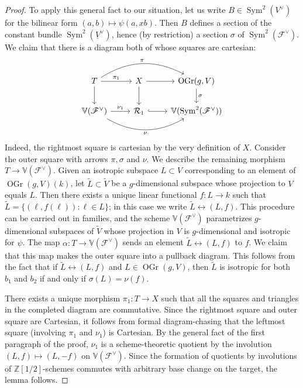 \documentclass{article} %
\numberwithin{equation}{section}
\DeclareMathOperator{\Sym}{Sym}
\newcommand{\sh}[1]{\mathscr{#1}}
\newcommand{\Z}{\mathbb{Z}}
\DeclareMathOperator{\OGr}{OGr}
\begin{document}
\begin{proof}
    To apply this general fact to our situation, 
   let us write $B \in \Sym^2(V^{\vee})$ for the bilinear form $(a,b)\mapsto \psi(a,xb)$. 
    Then $B$ defines a section of the constant bundle $\Sym^2(\underline{V}^{\vee})$, hence (by restriction)  a section $\sigma$ of $\Sym^2(\sh{F}^{\vee})$.
    We claim that there is a diagram both of whose squares are cartesian:
\begin{equation}
\label{diagram_threesquares}
\begin{tikzcd}
	T & X & {\OGr(g,V)} \\
	{\mathbb{V}(\sh{F}^{\vee})} & {\mathcal{R}_1} & {\mathbb{V}(\Sym^2(\sh{F}^{\vee}))}
	\arrow["\pi_1", from=1-1, to=1-2]
	\arrow["\pi", bend left = 30, from=1-1, to=1-3]
	\arrow[from=1-1, to=2-1]
	\arrow[from=1-2, to=1-3]
	\arrow[from=1-2, to=2-2]
	\arrow["\sigma", from=1-3, to=2-3]
	\arrow["{\nu_1}", from=2-1, to=2-2]
	\arrow["\nu"', bend right = 30, from=2-1, to=2-3]
	\arrow[hook, from=2-2, to=2-3]
\end{tikzcd}
\end{equation}
    Indeed, the rightmost square is cartesian by the very definition of $X$.
    Consider the outer square with arrows $\pi, \sigma$ and $\nu$.
    We describe the remaining morphism $T\rightarrow \mathbb{V}(\sh{F}^{\vee})$.
    Given an isotropic subspace $L\subset V$ corresponding to an element of $\OGr(g,V)(k)$, let $\tilde{L}\subset \tilde{V}$ be a $g$-dimensional subspace whose projection to $V$ equals $L$.
    Then there exists a unique linear functional $f \colon L \rightarrow k$ such that $\tilde{L} = \{(\ell, f(\ell))\colon \ell \in L\}$; in this case we write $\tilde{L} \leftrightarrow (L,f)$.
    This procedure can be carried out in families, and the scheme $\mathbb{V}(\sh{F}^{\vee})$ parametrizes $g$-dimensional subspaces of $\tilde{V}$ whose projection in $V$ is $g$-dimensional and isotropic for $\psi$.
    The map $\alpha\colon T\rightarrow \mathbb{V}(\sh{F}^{\vee})$ sends an element $\tilde{L}\leftrightarrow (L,f)$ to $f$.
    We claim that this map makes the outer square into a pullback diagram.
    This follows from the fact that if $\tilde{L} \leftrightarrow (L,f)$ and $L \in \OGr(g,V)$, then $\tilde{L}$ is isotropic for both $b_1$ and $b_2$ if and only if $\sigma(L)=\nu(f)$.

    There exists a unique morphism $\pi_1\colon T\rightarrow X$ such that all the squares and triangles in the completed diagram are commutative.
    Since the rightmost square and outer square are Cartesian, it follows from formal diagram-chasing that the leftmost square (involving $\pi_1$ and $\nu_1$) is Cartesian. 
    By the general fact of the first paragraph of the proof, $\nu_1$ is a scheme-theoretic quotient by the involution $(L,f)\mapsto (L, -f)$ on $\mathbb{V}(\sh{F}^{\vee})$.
    Since the formation of quotients by involutions of $\Z[1/2]$-schemes commutes with arbitrary base change on the target, the lemma follows.
 \end{proof}
\end{document}
